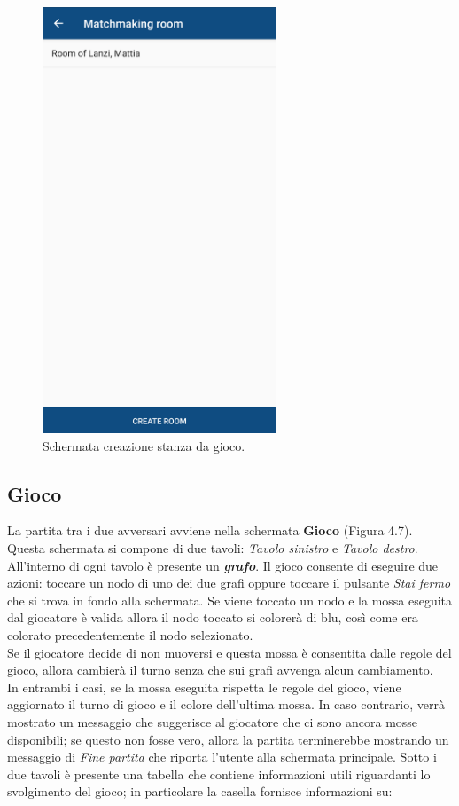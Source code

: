 \documentclass[a4paper,11pt,twoside,openright]{report}
\begin{document}
\begin{figure}[h]
\centering
\includegraphics[width=\linewidth,height=360pt,keepaspectratio]{images/MatchmakingRoom.png}
\caption{Schermata creazione stanza da gioco.}
\end{figure}

\subsection{Gioco}
La partita tra i due avversari avviene nella schermata \textbf{Gioco} (Figura 4.7). Questa schermata si compone di due tavoli: \textit{Tavolo sinistro} e \textit{Tavolo destro}.\\
All'interno di ogni tavolo è presente un \textbf{\textit{grafo}}. Il gioco consente di eseguire due azioni: toccare un nodo di uno dei due grafi oppure toccare il pulsante \textit{Stai fermo} che si trova in fondo alla schermata. Se viene toccato un nodo e la mossa eseguita dal giocatore è valida allora il nodo toccato si colorerà di blu, così come era colorato precedentemente il nodo selezionato.\\
Se il giocatore decide di non muoversi e questa mossa è consentita dalle regole del gioco, allora cambierà il turno senza che sui grafi avvenga alcun cambiamento.\\
In entrambi i casi, se la mossa eseguita rispetta le regole del gioco, viene aggiornato il turno di gioco e il colore dell'ultima mossa. In caso contrario, verrà mostrato un messaggio che suggerisce
al giocatore che ci sono ancora mosse disponibili; se questo non fosse vero, allora la partita terminerebbe mostrando un messaggio di \textit{Fine partita} che riporta l'utente alla schermata principale.
Sotto i due tavoli è presente una tabella che contiene informazioni utili riguardanti lo svolgimento del gioco; in particolare la casella fornisce informazioni su:
\end{document}
